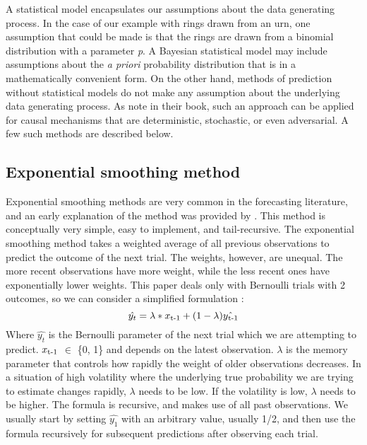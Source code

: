 \documentclass{article}
\begin{document}
A statistical model encapsulates our assumptions about the data generating process. In the case of our example with rings drawn from an urn, one assumption that could be made is that the rings are drawn from a binomial distribution with a parameter \textit{p}. A Bayesian statistical model may include assumptions about the \textit{a priori} probability distribution that is in a mathematically convenient form. On the other hand, methods of prediction without statistical models do not make any assumption about the underlying data generating process. As \cite{cesa2006prediction} note in their book, such an approach can be applied for causal mechanisms that are deterministic, stochastic, or even adversarial.  A few such methods are described below.

\subsection{Exponential smoothing method}
\label{expSmoothening}
Exponential smoothing methods are very common in the forecasting literature, and an early explanation of the method was provided by \cite{holt1957forecasting}. This method is conceptually very simple, easy to implement, and tail-recursive. The exponential smoothing method takes a weighted average of all previous observations to predict the outcome of the next trial. The weights, however, are unequal. The more recent observations have more weight, while the less recent ones have exponentially lower weights. This paper deals only with Bernoulli trials with 2 outcomes, so we can consider a simplified formulation : 
\[ \hat{y_t} = \lambda * x\textsubscript{t-1} + (1 - \lambda) \hat{y\textsubscript{t-1}} \]
Where $\hat{y_t}$ is the Bernoulli parameter of the next trial which we are attempting to predict. $x\textsubscript{t-1}$ $\in$ \{0, 1\} and depends on the latest observation. $\lambda$ is the memory parameter that controls how rapidly the weight of older observations decreases. In a situation of high volatility where the underlying true probability we are trying to estimate changes rapidly, $\lambda$ needs to be low. If the volatility is low, $\lambda$ needs to be higher. The formula is recursive, and makes use of all past observations. We usually start by setting $\hat{y_1}$ with an arbitrary value, usually 1/2, and then use the formula recursively for subsequent predictions after observing each trial.
\end{document}
